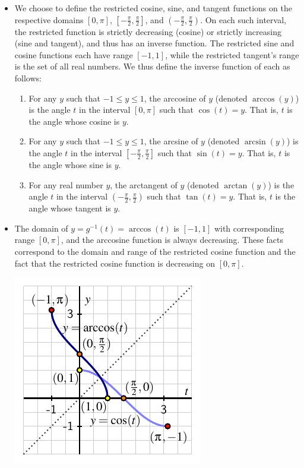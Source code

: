 \documentclass{ximera}
\begin{document}
\begin{summary}
  \begin{itemize}
\item We choose to define the restricted cosine, sine, and tangent functions on the respective domains $[0,\pi]$, $[-\frac{\pi}{2}, \frac{\pi}{2}]$, and $(-\frac{\pi}{2}, \frac{\pi}{2})$.  On each such interval, the restricted function is strictly decreasing (cosine) or strictly increasing (sine and tangent), and thus has an inverse function.  The restricted sine and cosine functions each have range $[-1,1]$, while the restricted tangent's range is the set of all real numbers.  We thus define the inverse function of each as follows:%
%
\begin{enumerate}[label=\roman*.]
\item
For any $y$ such that $-1 \le y \le 1$, the arccosine of $y$ (denoted $\arccos(y)$) is the angle $t$ in the interval $[0,\pi]$ such that $\cos(t) = y$.  That is, $t$ is the angle whose cosine is $y$.
%
\item%
For any $y$ such that $-1 \le y \le 1$, the arcsine of $y$ (denoted $\arcsin(y)$) is the angle $t$ in the interval $[-\frac{\pi}{2}, \frac{\pi}{2}]$ such that $\sin(t) = y$.  That is, $t$ is the angle whose sine is $y$.%
\item
For any real number $y$, the arctangent of $y$ (denoted $\arctan(y)$) is the angle $t$ in the interval $(-\frac{\pi}{2}, \frac{\pi}{2})$ such that $\tan(t) = y$.  That is, $t$ is the angle whose tangent is $y$.%
\end{enumerate}
%
\item
The domain of $y = g^{-1}(t) = \arccos(t)$ is $[-1,1]$ with corresponding range $[0,\pi]$, and the arccosine function is always decreasing.  These facts correspond to the domain and range of the restricted cosine function and the fact that the restricted cosine function is decreasing on $[0,\pi]$.
\begin{image}
\includegraphics{inverse-trig-arccos-graph.pdf}

\end{image}
\end{itemize}
\end{summary}
\end{document}
